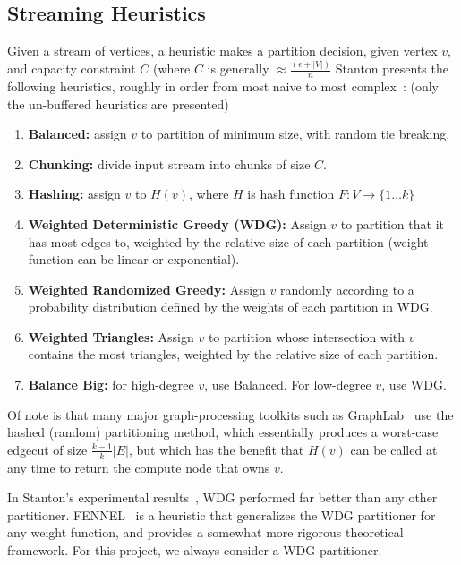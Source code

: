 \subsection{Streaming Heuristics}
Given a stream of vertices, a heuristic makes a partition decision, given vertex $v$, and capacity constraint $C$ (where $C$ is generally $\approx \frac{(\epsilon+|V|)}{n}$ Stanton presents the following heuristics, roughly in order from most naive to most complex~\cite{Stanton:2012:SGP:2339530.2339722}: (only the un-buffered heuristics are presented)

\begin{enumerate}
\item \textbf{Balanced:} assign $v$ to partition of minimum size, with random tie breaking.
\item \textbf{Chunking:} divide input stream into chunks of size $C$.
\item \textbf{Hashing:} assign $v$ to $H(v)$, where $H$ is hash function $F:V\to\{1\dots k\}$
\item \textbf{Weighted Deterministic Greedy (WDG):} Assign $v$ to partition that it has most edges to, weighted by the relative size of each partition (weight function can be linear or exponential).
\item \textbf{Weighted Randomized Greedy:} Assign $v$ randomly according to a probability distribution defined by the weights of each partition in WDG.
\item \textbf{Weighted Triangles:} Assign $v$ to partition whose intersection with $v$ contains the most triangles, weighted by the relative size of each partition.
\item \textbf{Balance Big:} for high-degree $v$, use Balanced. For low-degree $v$, use WDG. 
\end{enumerate}

Of note is that many major graph-processing toolkits such as GraphLab~\cite{Low:2012:DGF:2212351.2212354} use the hashed (random) partitioning method, which essentially produces a worst-case edgecut of size $\frac{k-1}{k}|E|$, but which has the benefit that $H(v)$ can be called at any time to return the compute node that owns $v$.


In Stanton's experimental results~\cite{Stanton:2012:SGP:2339530.2339722}, WDG performed far better than any other partitioner.
FENNEL~\cite{tsourakakis2012fennel} is a heuristic that generalizes the WDG partitioner for any weight function, and provides a somewhat more rigorous theoretical framework.
For this project, we always consider a WDG partitioner. 

